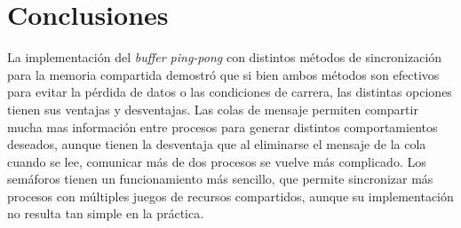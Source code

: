 \section{Conclusiones}
    La implementación del \textit{buffer ping-pong} con distintos métodos de sincronización para la memoria compartida demostró que si bien ambos métodos son efectivos para evitar la pérdida de datos o las condiciones de carrera, las distintas opciones tienen sus ventajas y desventajas. Las colas de mensaje permiten compartir mucha mas información entre procesos para generar distintos comportamientos deseados, aunque tienen la desventaja que al eliminarse el mensaje de la cola cuando se lee, comunicar más de dos procesos se vuelve más complicado. Los semáforos tienen un funcionamiento más sencillo, que permite sincronizar más procesos con múltiples juegos de recursos compartidos, aunque su implementación no resulta tan simple en la práctica.
\\